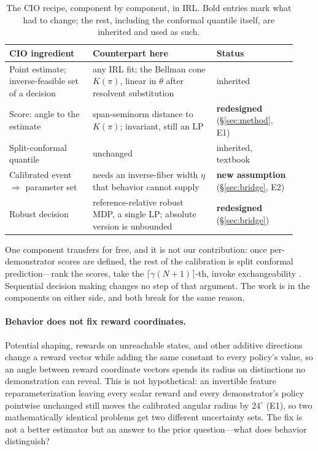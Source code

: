 \documentclass{article}
\begin{document}
\begin{table}[t]
\centering
\small
\caption{The CIO recipe, component by component, in IRL. Bold entries mark what
had to change; the rest, including the conformal quantile itself, are inherited
and used as such.}
\label{tab:recipe}
\begin{tabular}{@{}p{0.27\linewidth}p{0.40\linewidth}p{0.26\linewidth}@{}}
\toprule
CIO ingredient & Counterpart here & Status \\
\midrule
Point estimate; inverse-feasible set of a decision & any IRL fit; the Bellman
cone $K(\pi)$, linear in $\theta$ after resolvent substitution & inherited \\
Score: angle to the estimate & span-seminorm distance to $K(\pi)$; invariant,
still an LP & \textbf{redesigned} (\S\ref{sec:method}, E1) \\
Split-conformal quantile & unchanged & inherited, textbook \\
Calibrated event $\Rightarrow$ parameter set & needs an inverse-fiber width
$\eta$ that behavior cannot supply & \textbf{new assumption}
(\S\ref{sec:bridge}, E2) \\
Robust decision & reference-relative robust MDP, a single LP; absolute version
is unbounded & \textbf{redesigned} (\S\ref{sec:bridge}) \\
\bottomrule
\end{tabular}
\end{table}

One component transfers for free, and it is not our contribution: once
per-demonstrator scores are defined, the rest of the calibration is split
conformal prediction---rank the scores, take the $\lceil\gamma(N+1)\rceil$-th,
invoke exchangeability \citep{vovk2005algorithmic,lin2024conformal}. Sequential
decision making changes no step of that argument. The work is in the components
on either side, and both break for the same reason.

\paragraph{Behavior does not fix reward coordinates.} Potential shaping, rewards
on unreachable states, and other additive directions change a reward vector
while adding the same constant to every policy's value, so an angle between
reward coordinate vectors spends its radius on distinctions no demonstration can
reveal. This is not hypothetical: an invertible feature reparameterization
leaving every scalar reward and every demonstrator's policy pointwise unchanged
still moves the calibrated angular radius by $24^\circ$ (E1), so two
mathematically identical problems get two different uncertainty sets. The fix is
not a better estimator but an answer to the prior question---what does behavior
distinguish?
\end{document}
